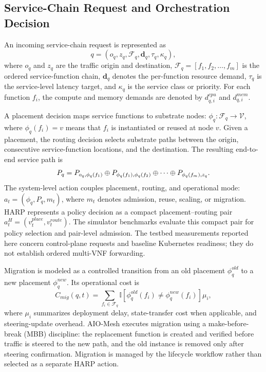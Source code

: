 \documentclass[final,5p]{elsarticle}
\newcommand{\rev}[1]{\textcolor{revisiongreen}{#1}}
\let\newrev\rev
\begin{document}
\subsection{Service-Chain Request and Orchestration Decision}
\label{subsec:sfc_model}

An incoming service-chain request is represented as
\begin{equation}
q=(o_q,z_q,\mathcal{F}_q,\mathbf{d}_q,\tau_q,\kappa_q),
\end{equation}
where \(o_q\) and \(z_q\) are the traffic origin and destination, \(\mathcal{F}_q=[f_1,f_2,\ldots,f_m]\) is the ordered service-function chain, \(\mathbf{d}_q\) denotes the per-function resource demand, \(\tau_q\) is the service-level latency target, and \(\kappa_q\) is the service class or priority. For each function \(f_i\), the compute and memory demands are denoted by \(d_{q,i}^{cpu}\) and \(d_{q,i}^{mem}\).

A placement decision maps service functions to substrate nodes: $\phi_q:\mathcal{F}_q\rightarrow\mathcal{V}$, where \(\phi_q(f_i)=v\) means that \(f_i\) is instantiated or reused at node \(v\). Given a placement, the routing decision selects substrate paths between the origin, consecutive service-function locations, and the destination. The resulting end-to-end service path is
\begin{equation}
\rev{P_q=P_{o_q,\phi_q(f_1)}\oplus P_{\phi_q(f_1),\phi_q(f_2)}\oplus\cdots\oplus P_{\phi_q(f_m),z_q}.}
\label{eq:full_chain_path}
\end{equation}
\newrev{The system-level action couples placement, routing, and operational mode: $a_t=(\phi_q,P_q,m_t)$, where \(m_t\) denotes admission, reuse, scaling, or migration. HARP represents a policy decision as a compact placement--routing pair \(a_t^H=(v_t^{place},v_t^{route})\). The simulator benchmarks evaluate this compact pair for policy selection and pair-level admission. The testbed measurements reported here concern control-plane requests and baseline Kubernetes readiness; they do not establish ordered multi-VNF forwarding.}

Migration is modeled as a controlled transition from an old placement \(\phi_q^{old}\) to a new placement \(\phi_q^{new}\). Its operational cost is
\begin{equation}
C_{mig}(q,t)=\sum_{f_i\in\mathcal{F}_q}\mathbb{I}\!\left[\phi_q^{old}(f_i)\neq\phi_q^{new}(f_i)\right]\mu_i,
\end{equation}
where \(\mu_i\) summarizes deployment delay, state-transfer cost when applicable, and steering-update overhead. AIO-Mesh executes migration using a \rev{make-before-break (MBB)} discipline: the replacement function is created and verified before traffic is steered to the new path, and the old instance is removed only after steering confirmation. \rev{Migration is managed by the lifecycle workflow rather than selected as a separate HARP action.}
\end{document}
